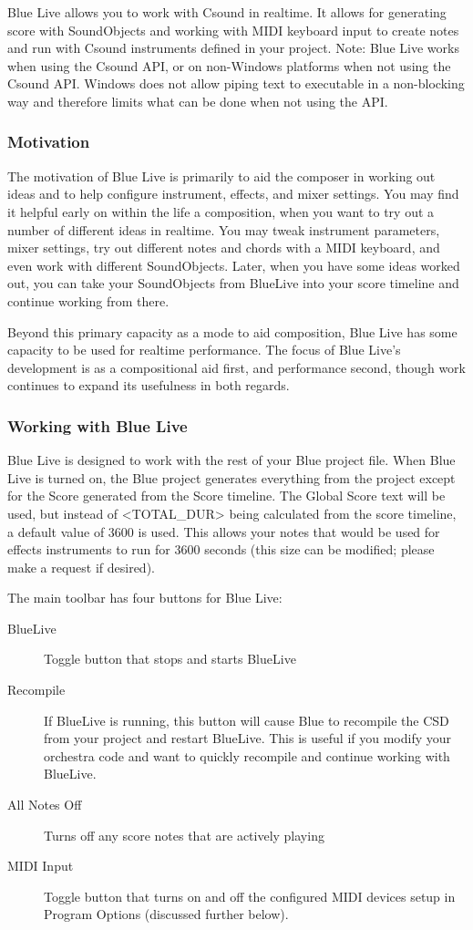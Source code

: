 Blue Live allows you to work with Csound in realtime. It allows for
generating score with SoundObjects and working with MIDI keyboard input
to create notes and run with Csound instruments defined in your project.
Note: Blue Live works when using the Csound API, or on non-Windows
platforms when not using the Csound API. Windows does not allow piping
text to executable in a non-blocking way and therefore limits what can
be done when not using the API.

\subsubsection{Motivation}

The motivation of Blue Live is primarily to aid the composer in working
out ideas and to help configure instrument, effects, and mixer settings.
You may find it helpful early on within the life a composition, when you
want to try out a number of different ideas in realtime. You may tweak
instrument parameters, mixer settings, try out different notes and
chords with a MIDI keyboard, and even work with different SoundObjects.
Later, when you have some ideas worked out, you can take your
SoundObjects from BlueLive into your score timeline and continue working
from there.

Beyond this primary capacity as a mode to aid composition, Blue Live has
some capacity to be used for realtime performance. The focus of Blue
Live's development is as a compositional aid first, and performance
second, though work continues to expand its usefulness in both regards.

\subsubsection{Working with Blue Live}

Blue Live is designed to work with the rest of your Blue project file.
When Blue Live is turned on, the Blue project generates everything from
the project except for the Score generated from the Score timeline. The
Global Score text will be used, but instead of
\textless{}TOTAL\_DUR\textgreater{} being calculated from the score
timeline, a default value of 3600 is used. This allows your notes that
would be used for effects instruments to run for 3600 seconds (this size
can be modified; please make a request if desired).

The main toolbar has four buttons for Blue Live:

\begin{description}
\item[BlueLive]
Toggle button that stops and starts BlueLive
\item[Recompile]
If BlueLive is running, this button will cause Blue to recompile the CSD
from your project and restart BlueLive. This is useful if you modify
your orchestra code and want to quickly recompile and continue working
with BlueLive.
\item[All Notes Off]
Turns off any score notes that are actively playing
\item[MIDI Input]
Toggle button that turns on and off the configured MIDI devices setup in
Program Options (discussed further below).
\end{description}

